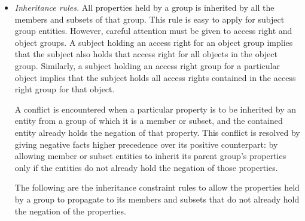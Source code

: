 \documentclass[glov2,twocolumn,final]{svjour2}
\newenvironment{vquote}
  {\begin{list}{}{\leftmargin 1em}\item[]}
  {\end{list}}
\begin{document}
          \begin{itemize}
            \item
              {\em Inheritance rules.}
              All properties held by a group is inherited by all the members
              and subsets of that group. This rule is easy to apply for subject
              group entities. However, careful attention must be given to access
              right and object groups. A subject holding an access right for an
              object group implies that the subject also holds that access
              right for all objects in the object group. Similarly, a subject
              holding an access right group for a particular object implies
              that the subject holds all access rights contained in the access
              right group for that object.

              A conflict is encountered when a particular property is to be
              inherited by an entity from a group of which it is a member or
              subset, and the contained entity already holds the negation of
              that property. This conflict is resolved by giving negative facts
              higher precedence over its positive counterpart: by allowing
              member or subset entities to inherit its parent group's
              properties only if the entities do not already hold the negation
              of those properties.

              The following are the inheritance constraint rules to allow the
              properties held by a group to propagate to its members and
              subsets that do not already hold the negation of the properties.

\end{itemize}
\end{document}
